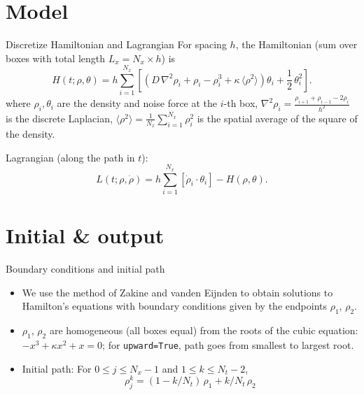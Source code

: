 \documentclass{beamer}
\begin{document}
\section{Model}
\begin{frame}{Discretize Hamiltonian and Lagrangian}
    For spacing $h$, the Hamiltonian (sum over boxes with total length $L_x=N_x\times h$) is
    \begin{equation}
        H(t;\rho,\theta) = h\sum_{i=1}^{N_x} \left[ (D\,\nabla^2\rho_i + \rho_i - \rho_i^3 + \kappa\,\langle \rho^2 \rangle)  \theta_i + \frac{1}{2}\,\theta_i^2\right].
    \end{equation}
    where $\rho_i, \theta_i$ are the density and noise force at the $i$-th box, $\nabla^2\rho_i = \frac{\rho_{i+1} + \rho_{i-1} - 2\rho_i}{h^2}$ is the discrete Laplacian, $\langle \rho^2 \rangle = \frac{1}{N_x} \sum_{i=1}^{N_x} \rho_i^2$ is the spatial average of the square of the density.

    Lagrangian (along the path in $t$):
    \begin{equation}
        L(t;\rho,\dot{\rho}) = h\sum_{i=1}^{N_x} \left[ \dot{\rho}_i \cdot \theta_i \right]- H(\rho,\theta).
    \end{equation}
\end{frame}


\section{Initial \& output}
\begin{frame}{Boundary conditions and initial path}
    \begin{itemize}
        \item We use the method of Zakine and vanden Eijnden to obtain solutions to Hamilton's equations with boundary conditions given by the endpoints $\rho_1$, $\rho_2$.
    
        \item $\rho_1$, $\rho_2$ are homogeneous (all boxes equal) from the roots of the cubic equation: $-x^3 + \kappa x^2 + x = 0$; for \texttt{upward=True}, path goes from smallest to largest root.
        \item Initial path: For $0 \le j \le N_x-1$ and $1 \le k \le N_t-2$,
        \begin{equation}
            \rho^k_j = (1-k/N_t)\,\rho_1 + k/N_t\,\rho_2 %
        \end{equation}
    \end{itemize}
\end{frame}
\end{document}
